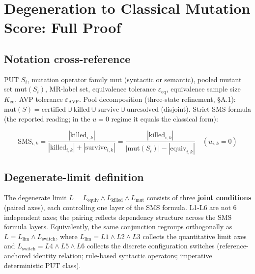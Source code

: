 \documentclass[manuscript,screen,review]{acmart}
\begin{document}

\section{Degeneration to Classical Mutation Score: Full Proof}\label{g.-sms-ms-degeneration-theorem-full-proof}

\subsection{Notation cross-reference}\label{g.1-notation-cross-reference-with-2.1}

PUT $S_i$, mutation operator family mut (syntactic or semantic),
pooled mutant set $\mathrm{mut}(S_i)$, MR-label set, equivalence tolerance $\varepsilon_{\mathrm{eq}}$, equivalence
sample size $K_{\mathrm{eq}}$, AVP tolerance $\varepsilon_{\mathrm{AVP}}$. Pool
decomposition (three-state refinement, §A.1):
$\mathrm{mut}(S) = \mathrm{certified} \cup \mathrm{killed} \cup \mathrm{survive} \cup \mathrm{unresolved}$
(disjoint). Strict SMS formula (the reported reading; in the
$u = 0$ regime it equals the classical form):

\[
\mathrm{SMS}_{i,k} = \frac{|\mathrm{killed}_{i,k}|}{|\mathrm{killed}_{i,k}| + |\mathrm{survive}_{i,k}|}
= \frac{|\mathrm{killed}_{i,k}|}{|\mathrm{mut}(S_i)| - |\mathrm{equiv}_{i,k}|} \quad (u_{i,k} = 0)
\]

\subsection{Degenerate-limit definition}\label{g.2-degenerate-limit-definition-r-8-p1-3-revision-3-joint-conditions}

The degenerate limit $L = L_{\mathrm{equiv}} \wedge L_{\mathrm{killed}} \wedge L_{\mathrm{mut}}$
consists of three \textbf{joint conditions} (paired axes), each
controlling one layer of the SMS formula. L1-L6 are not 6 independent
axes; the pairing reflects dependency structure across the SMS formula
layers. Equivalently, the same conjunction regroups orthogonally as
$L = L_{\mathrm{lim}} \wedge L_{\mathrm{switch}}$, where
$L_{\mathrm{lim}} = L1 \wedge L2 \wedge L3$ collects the quantitative
limit axes and $L_{\mathrm{switch}} = L4 \wedge L5 \wedge L6$ collects
the discrete configuration switches (reference-anchored identity
relation; rule-based syntactic operators; imperative deterministic PUT
class).
\end{document}
